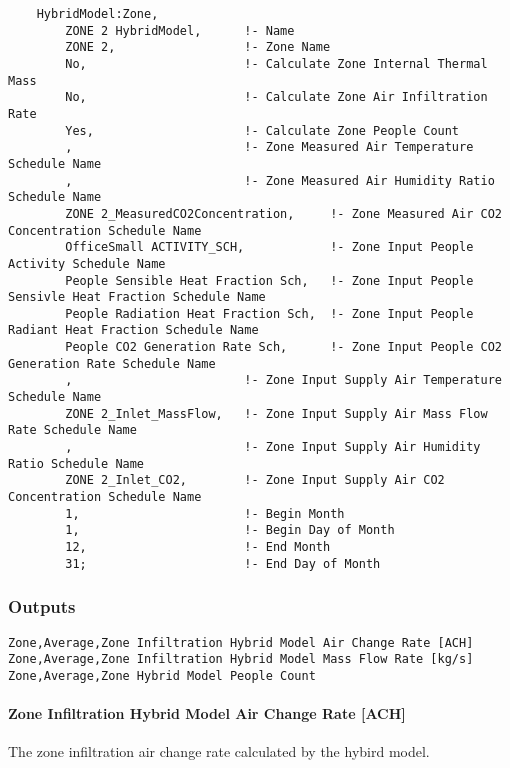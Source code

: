\begin{lstlisting}
    HybridModel:Zone,
        ZONE 2 HybridModel,      !- Name
        ZONE 2,                  !- Zone Name
        No,                      !- Calculate Zone Internal Thermal Mass
        No,                      !- Calculate Zone Air Infiltration Rate
        Yes,                     !- Calculate Zone People Count
        ,                        !- Zone Measured Air Temperature Schedule Name
        ,                        !- Zone Measured Air Humidity Ratio Schedule Name
        ZONE 2_MeasuredCO2Concentration,     !- Zone Measured Air CO2 Concentration Schedule Name
        OfficeSmall ACTIVITY_SCH,            !- Zone Input People Activity Schedule Name
        People Sensible Heat Fraction Sch,   !- Zone Input People Sensivle Heat Fraction Schedule Name
        People Radiation Heat Fraction Sch,  !- Zone Input People Radiant Heat Fraction Schedule Name
        People CO2 Generation Rate Sch,      !- Zone Input People CO2 Generation Rate Schedule Name
        ,                        !- Zone Input Supply Air Temperature Schedule Name
        ZONE 2_Inlet_MassFlow,   !- Zone Input Supply Air Mass Flow Rate Schedule Name
        ,                        !- Zone Input Supply Air Humidity Ratio Schedule Name
        ZONE 2_Inlet_CO2,        !- Zone Input Supply Air CO2 Concentration Schedule Name
        1,                       !- Begin Month
        1,                       !- Begin Day of Month
        12,                      !- End Month
        31;                      !- End Day of Month

\end{lstlisting}


\subsubsection{Outputs}\label{outputs-030}

\begin{lstlisting}
Zone,Average,Zone Infiltration Hybrid Model Air Change Rate [ACH]
Zone,Average,Zone Infiltration Hybrid Model Mass Flow Rate [kg/s]
Zone,Average,Zone Hybrid Model People Count
\end{lstlisting}

\paragraph{Zone Infiltration Hybrid Model Air Change Rate {[}ACH{]}}\label{zone-infiltration-hybrid-model-air-change-rate}

The zone infiltration air change rate calculated by the hybird model.

